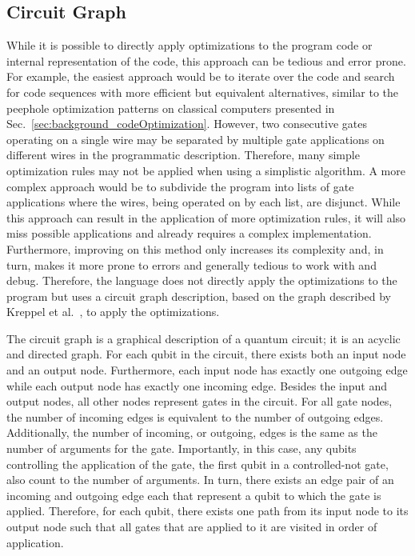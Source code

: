 \subsection{Circuit Graph}
\label{sec:concept_circuitGraph}
While it is possible to directly apply optimizations to the program code or internal representation of the code, this approach can be tedious and error prone. For example, the easiest approach would be to iterate over the code and search for code sequences with more efficient but equivalent alternatives, similar to the peephole optimization patterns on classical computers presented in Sec.~\ref{sec:background_codeOptimization}. However, two consecutive gates operating on a single wire may be separated by multiple gate applications on different wires in the programmatic description. 
Therefore, many simple optimization rules may not be applied when using a simplistic algorithm. A more complex approach would be to subdivide the program into lists of gate applications where the wires, being operated on by each list, are disjunct. While this approach can result in the application of more optimization rules, it will also miss possible applications and already requires a complex implementation. Furthermore, improving on this method only increases its complexity and, in turn, makes it more prone to errors and generally tedious to work with and debug. Therefore, the language does not directly apply the optimizations to the program but uses a circuit graph description, based on the graph described by Kreppel et al.~\cite{KMO*23}, to apply the optimizations.

The circuit graph is a graphical description of a quantum circuit; it is an acyclic and directed graph. For each qubit in the circuit, there exists both an input node and an output node. Furthermore, each input node has exactly one outgoing edge while each output node has exactly one incoming edge. Besides the input and output nodes, all other nodes represent gates in the circuit. For all gate nodes, the number of incoming edges is equivalent to the number of outgoing edges. Additionally, the number of incoming, or outgoing, edges is the same as the number of arguments for the gate. Importantly, in this case, any qubits controlling the application of the gate, \eg the first qubit in a controlled-not gate, also count to the number of arguments. In turn, there exists an edge pair of an incoming and outgoing edge each that represent a qubit to which the gate is applied. Therefore, for each qubit, there exists one path from its input node to its output node such that all gates that are applied to it are visited in order of application.

